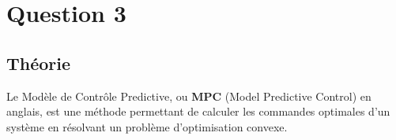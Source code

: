 \documentclass[../CSC_5RO16_TA_TP4.tex]{subfiles}
\begin{document}
\section{Question 3}


\subsection{Théorie}
\noindent Le Modèle de Contrôle Predictive, ou \textbf{MPC} (Model Predictive Control) en anglais, est une méthode permettant de calculer les commandes optimales d'un système en résolvant un problème d'optimisation convexe.
\end{document}
